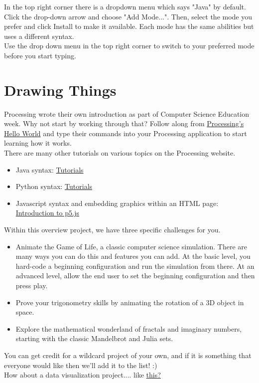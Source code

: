 \documentclass{42-en}
\begin{document}
In the top right corner there is a dropdown menu which says "Java" by default. Click the drop-down arrow and choose "Add Mode...". Then, select the mode you prefer and click Install to make it available. Each mode has the same abilities but uses a different syntax.\\

Use the drop down menu in the top right corner to switch to your preferred mode before you start typing.



\chapter{Drawing Things}

Processing wrote their own introduction as part of Computer Science Education week. Why not start by working through that? Follow along from \href{http://hello.processing.org/}{Processing's Hello World} and type their commands into your Processing application to start learning how it works.\\

There are many other tutorials on various topics on the Processing website.\\

\begin{itemize}
	\item Java syntax: \href{https://processing.org/tutorials/}{Tutorials}
	\item Python syntax: \href{http://py.processing.org/tutorials/}{Tutorials}
	\item Javascript syntax and embedding graphics within an HTML page: \href{https://p5js.org/learn/}{Introduction to p5.js}
\end{itemize}

Within this overview project, we have three specific challenges for you.
\begin{itemize}
	\item Animate the Game of Life, a classic computer science simulation. There are many ways you can do this and features you can add. At the basic level, you hard-code a beginning configuration and run the simulation from there. At an advanced level, allow the end user to set the beginning configuration and then press play.
	\item Prove your trigonometry skills by animating the rotation of a 3D object in space.
	\item Explore the mathematical wonderland of fractals and imaginary numbers, starting with the classic Mandelbrot and Julia sets. 
\end{itemize}

You can get credit for a wildcard project of your own, and if it is something that everyone would like then we'll add it to the list! :)\\

How about a data visualization project.... like \href{http://me.whererabbitsthink.com/index.php/2017/09/11/facebook-friends/}{this?}
\end{document}
